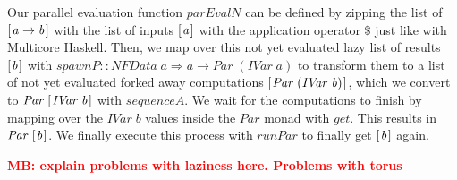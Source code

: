 \documentclass{jfp1}
\newcommand{\Conid}[1]{\mathit{#1}}
\newcommand{\Varid}[1]{\mathit{#1}}
\newcommand{\comm}[2]{\textcolor{red}{\bfseries #1: #2}}
\newcommand{\mbcomment}[1]{\comm{MB}{#1}}
\begin{document}
Our parallel evaluation function \ensuremath{\Varid{parEvalN}} can be defined by zipping the list of \ensuremath{[\mskip1.5mu \Varid{a}\to \Varid{b}\mskip1.5mu]} with the list of inputs \ensuremath{[\mskip1.5mu \Varid{a}\mskip1.5mu]} with the application operator \ensuremath{\mathbin{\$}} just like with Multicore Haskell. %
Then, we map over this not yet evaluated lazy list of results \ensuremath{[\mskip1.5mu \Varid{b}\mskip1.5mu]} with \ensuremath{\Varid{spawnP}\mathbin{::}\Conid{NFData}\;\Varid{a}\Rightarrow \Varid{a}\to \Conid{Par}\;(\Conid{IVar}\;\Varid{a})} to transform them to a list of not yet evaluated forked away computations \ensuremath{[\mskip1.5mu \Conid{Par}\;(\Conid{IVar}\;\Varid{b})\mskip1.5mu]}, which we convert to \ensuremath{\Conid{Par}\;[\mskip1.5mu \Conid{IVar}\;\Varid{b}\mskip1.5mu]} with \ensuremath{\Varid{sequenceA}}. We wait for the computations to finish by mapping over the \ensuremath{\Conid{IVar}\;\Varid{b}} values inside the \ensuremath{\Conid{Par}} monad with \ensuremath{\Varid{get}}. This results in \ensuremath{\Conid{Par}\;[\mskip1.5mu \Varid{b}\mskip1.5mu]}. We finally execute this process with \ensuremath{\Varid{runPar}} to finally get \ensuremath{[\mskip1.5mu \Varid{b}\mskip1.5mu]} again.

\mbcomment{explain problems with laziness here. Problems with torus}
\end{document}
